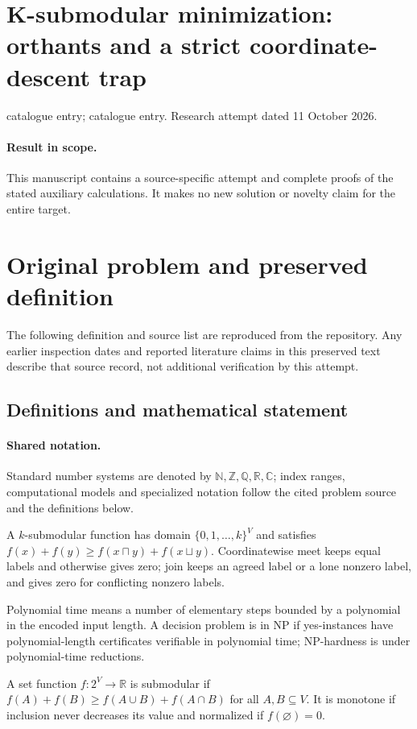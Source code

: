 \documentclass[11pt]{article}
\begin{document}
\section*{K-submodular minimization: orthants and a strict coordinate-descent trap}
\noindent catalogue entry; catalogue entry. Research attempt dated 11 October 2026.
\paragraph{Result in scope.}This manuscript contains a source-specific attempt and complete proofs of the stated auxiliary calculations. It makes no new solution or novelty claim for the entire target.
\section{Original problem and preserved definition}
The following definition and source list are reproduced from the repository. Any earlier inspection dates and reported literature claims in this preserved text describe that source record, not additional verification by this attempt.
\subsection{Definitions and mathematical statement}

\paragraph{Shared notation.}Standard number systems are denoted by $\mathbb N,\mathbb Z,\mathbb Q,\mathbb R,\mathbb C$; index ranges, computational models and specialized notation follow the cited problem source and the definitions below.


A $k$-submodular function has domain $\{0,1,\ldots,k\}^V$ and satisfies $f(x)+f(y)\geq f(x\sqcap y)+f(x\sqcup y)$. Coordinatewise meet keeps equal labels and otherwise gives zero; join keeps an agreed label or a lone nonzero label, and gives zero for conflicting nonzero labels.

Polynomial time means a number of elementary steps bounded by a polynomial in the encoded input length. A decision problem is in $\mathrm{NP}$ if yes-instances have polynomial-length certificates verifiable in polynomial time; NP-hardness is under polynomial-time reductions.

A set function $f:2^V\to\mathbb R$ is submodular if $f(A)+f(B)\geq f(A\cup B)+f(A\cap B)$ for all $A,B\subseteq V$. It is monotone if inclusion never decreases its value and normalized if $f(\varnothing)=0$.
\end{document}
